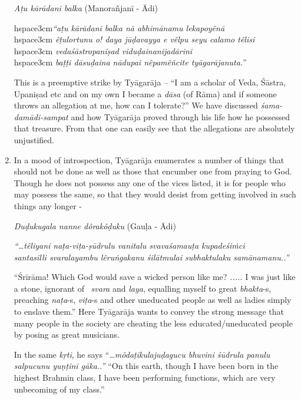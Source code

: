 \begin{enumerate}
 \textit{Aṭu kārādani balka} (Manorañjanī - Ādi)

\begin{myquote}
hspace{3cm}\textit{“aṭu kārādani balka nā abhimānamu lekapoyênā} \\hspace{3cm} \textit{êṭulortunu o! daya jūḍavayya e vêlpu seyu calamo têlisi}\\hspace{3cm} \textit{vedaśāstropaniṣad viduḍainanijadārini} \\hspace{3cm} \textit{baṭṭi dāsuḍaina nādupai nêpamêñcite tyāgarājanuta.}”
\end{myquote}

 This is a preemptive strike by Tyāgarāja – “I am a scholar of Veda, Śāstra, Upaniṣad etc and on my own I became a \textit{dāsa} (of Rāma) and if someone throws an allegation at me, how can I tolerate?” We have discussed \textit{śama-damādi-sampat} and how Tyāgarāja proved through his life how he possessed that treasure. From that one can easily see that the allegations are absolutely unjustified.

 \item 
 In a mood of introspection, Tyāgarāja enumerates a number of things that should not be done as well as those that encumber one from praying to God. Though he does not possess any one of the vices listed, it is for people who may possess the same, so that they would desist from getting involved in such things any longer -  

 \textit{Duḍukugala nanne dôrakôḍuku} (Gauḷa - Ādi)

\begin{myquote}
\textit{“…têliyani naṭa-viṭa-ṣūdrulu vanitalu svavaśamauṭa kupadeśiṁci}\\\textit{santasilli svaralayambu lêruṅgakanu śilātmulai subhaktulaku samānamanu..”}
\end{myquote}

 “Śrīrāma! Which God would save a wicked person like me? \textit{.....} I was just like a stone, ignorant of  \textit{svara} and \textit{laya}, equalling myself to great \textit{bhakta}-s, preaching \textit{naṭa}-s, \textit{viṭa}-s and other uneducated people as well as ladies simply to enslave them.” Here Tyāgarāja wants to convey the strong message that many people in the society are cheating the less educated/uneducated people by posing as great musicians.

 In the same \textit{kṛti}, he says “\textit{…môdaṭikulajuḍagucu bhuvini śūdrula panulu salpucunu yuṇṭini gāka..”} “On this earth, though I have been born in the highest Brahmin class, I have been performing functions, which are very unbecoming of my class.”


\end{enumerate}
